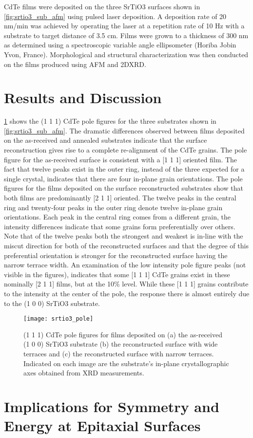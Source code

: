 CdTe films were deposited on the three SrTiO3 surfaces shown
in \cref{fig:srtio3_sub_afm} using pulsed laser deposition. A deposition rate of 20 nm/min was achieved by
operating the laser at a repetition rate of 10 Hz with a substrate to
target distance of 3.5 cm. Films were grown to
a thickness of 300 nm as determined using a spectroscopic variable
angle ellipsometer (Horiba Jobin Yvon, France). Morphological and
structural characterization was then conducted on the films
produced using AFM and 2DXRD.
\section{Results and Discussion}
\cref{fig:srtio3_pole} shows the (1 1 1) CdTe pole figures for the three substrates
shown in \cref{fig:srtio3_sub_afm}. The dramatic differences observed between films
deposited on the as-received and annealed substrates indicate that
the surface reconstruction gives rise to a complete re-alignment of
the CdTe grains. The pole figure for the as-received surface is
consistent with a [1 1 1] oriented film. The fact that twelve peaks
exist in the outer ring, instead of the three expected for a single
crystal, indicates that there are four in-plane grain orientations.
The pole figures for the films deposited on the surface reconstructed substrates show that both films are predominantly [2 1 1]
oriented. The twelve peaks in the central ring and twenty-four
peaks in the outer ring denote twelve in-plane grain orientations. Each peak in the central ring comes from a different grain, the intensity differences indicate that some grains form
preferentially over others. Note that of the twelve peaks both
the strongest and weakest is in-line with the miscut direction for
both of the reconstructed surfaces and that the degree of this
preferential orientation is stronger for the reconstructed surface
having the narrow terrace width. An examination of the low
intensity pole figure peaks (not visible in the figures), indicates that
some [1 1 1] CdTe grains exist in these nominally [2 1 1] films, but
at the 10\% level. While these [1 1 1] grains contribute to
the intensity at the center of the pole, the response there is almost
entirely due to the (1 0 0) SrTiO3 substrate.
\begin{figure}
    \centering
    \texttt{[image: srtio3\_pole]}
    \caption{\label{fig:srtio3_pole}(1 1 1) CdTe pole figures for films deposited on (a) the as-received (1 0 0) SrTiO3 substrate (b) the reconstructed surface with wide terraces and (c) the reconstructed
        surface with narrow terraces. Indicated on each image are the substrate’s in-plane crystallographic axes obtained from XRD measurements.}
\end{figure}



\section{Implications for Symmetry and Energy at Epitaxial Surfaces}